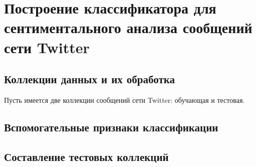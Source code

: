 \newpage
\section{Построение классификатора для сентиментального анализа сообщений сети Twitter}

    \subsection{Коллекции данных и их обработка}
    Пусть имеется две коллекции сообщений сети Twitter: обучающая и тестовая.
    \subsection{Вспомогательные признаки классификации}
    \subsection{Составление тестовых коллекций}
